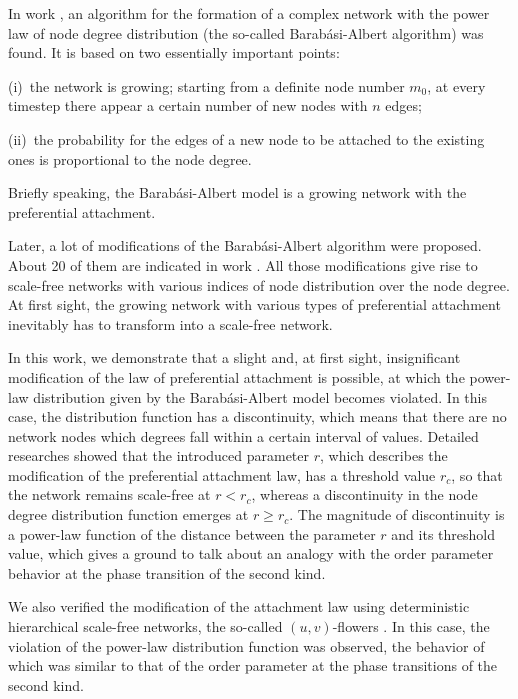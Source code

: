 \documentclass[aps,preprint]{revtex4}%
\begin{document}
In work \cite{AlBa1}, an algorithm for the formation of a complex network with
the power law of node degree distribution (the so-called Barab\'{a}si-Albert
algorithm) was found. It is based on two essentially important points:

\noindent(i)~the network is growing; starting from a definite node number
$m_{0}$, at every timestep there appear a certain number of new nodes with $n$ edges;

\noindent(ii)~the probability for the edges of a new node to be attached to
the existing ones is proportional to the node degree.

\noindent Briefly speaking, the Barab\'{a}si-Albert model is a growing network
with the preferential attachment.

Later, a lot of modifications of the Barab\'{a}si-Albert algorithm were
proposed. About 20 of them are indicated in work \cite{AlBa2}. All those
modifications give rise to scale-free networks with various indices of node
distribution over the node degree. At first sight, the growing network with
various types of preferential attachment inevitably has to transform into a
scale-free network.

In this work, we demonstrate that a slight and, at first sight, insignificant
modification of the law of preferential attachment is possible, at which the
power-law distribution given by the Barab\'{a}si-Albert model becomes
violated. In this case, the distribution function has a discontinuity, which
means that there are no network nodes which degrees fall within a certain
interval of values. Detailed researches showed that the introduced parameter
$r$, which describes the modification of the preferential attachment law, has
a threshold value $r_{c}$, so that the network remains scale-free at $r<r_{c}%
$, whereas a discontinuity in the node degree distribution function emerges at
$r\geq r_{c}$. The magnitude of discontinuity is a power-law function of the
distance between the parameter $r$ and its threshold value, which gives a
ground to talk about an analogy with the order parameter behavior at the phase
transition of the second kind.

We also verified the modification of the attachment law using deterministic
hierarchical scale-free networks, the so-called $(u,v)$-flowers \cite{Dor1}.
In this case, the violation of the power-law distribution function was
observed, the behavior of which was similar to that of the order parameter at
the phase transitions of the second kind.
\end{document}
